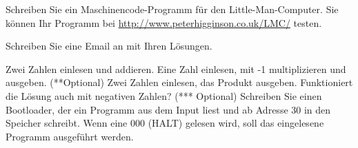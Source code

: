 \begin{question}
    Schreiben Sie ein Maschinencode-Programm für den Little-Man-Computer. Sie können Ihr Programm bei \url{http://www.peterhigginson.co.uk/LMC/} testen.

    Schreiben Sie eine Email an \mail{} mit Ihren Lösungen.
    \begin{tasks}
        \task Zwei Zahlen einlesen und addieren. 
        \task Eine Zahl einlesen, mit -1 multiplizieren und ausgeben.
        \task (**Optional) Zwei Zahlen einlesen, das Produkt ausgeben. Funktioniert die Lösung auch mit negativen Zahlen?
		\task (*** Optional) Schreiben Sie einen Bootloader, der ein Programm aus dem Input liest und ab Adresse 30 in den Speicher schreibt. Wenn eine 000 (HALT) gelesen wird, soll das eingelesene Programm ausgeführt werden.
    \end{tasks}
\end{question}
